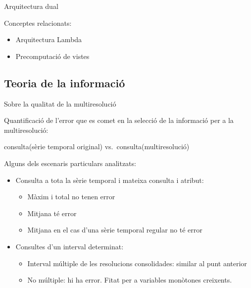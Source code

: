\begin{frame}{Arquitectura dual}

Conceptes relacionats: 
\begin{itemize}
\item Arquitectura Lambda \parencite{marz14:bigdata} 
\item Precomputació de vistes \parencite{date04:introduction8}
\end{itemize}





\end{frame}




\subsection*{Teoria de la informació}
\begin{frame}{Sobre la qualitat de la multiresolució}

  Quantificació de l'error que es comet en la selecció de la informació
  per a la multiresolució:

\begin{center}
consulta(sèrie temporal original) vs.\ consulta(multiresolució)
\end{center}


Alguns dels escenaris particulars analitzats:
\begin{itemize}
\item Consulta a tota la sèrie temporal i mateixa consulta i atribut:
  \begin{itemize}
  \item Màxim i total no tenen error
  \item Mitjana té error
  \item Mitjana en el cas d'una sèrie temporal regular no té error 
  \end{itemize}

\item Consultes d'un interval determinat:
  \begin{itemize}
  \item Interval múltiple de les resolucions consolidades: similar al punt anterior
  \item No múltiple: hi ha error. Fitat per a variables monòtones creixents.
  \end{itemize}



\end{itemize}

\end{frame}


